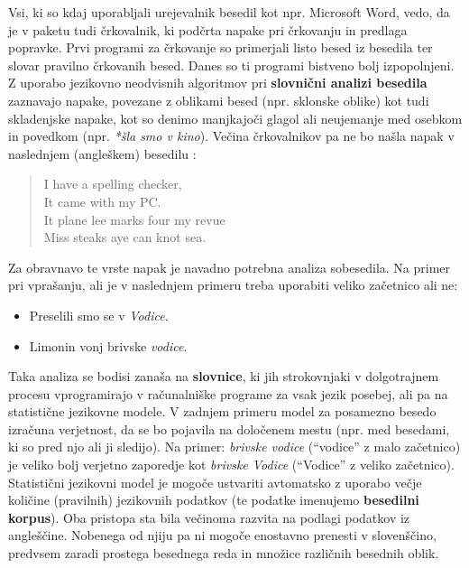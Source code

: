 \begin{multicols}{2}
Vsi, ki so kdaj uporab\-ljali urejevalnik besedil kot npr. Microsoft Word, vedo, da je v paketu tudi črkovalnik, ki podčrta napake pri črkovanju in predlaga popravke. Prvi programi za črkovanje so primerjali listo besed iz besedila ter slovar pravilno črkovanih besed. Danes so ti programi bistveno bolj izpopolnjeni. Z uporabo jezikovno neodvisnih algoritmov pri \textbf{slovnični analizi besedila} zaznavajo napake, povezane z oblikami besed (npr. sklonske oblike) kot tudi skladenjske napake, kot so denimo manjkajoči glagol ali  neujemanje med osebkom in povedkom (npr. \textit{*šla smo v kino}). Večina črkovalnikov pa ne bo našla napak v naslednjem (angleškem) besedilu \cite{zar1}:

\begin{quote}
  I have a spelling checker,\\
  It came with my PC.\\
  It plane lee marks four my revue\\
  Miss steaks aye can knot sea.
\end{quote}

Za obravnavo te vrste napak je navadno potrebna analiza sobesedila. Na primer pri vprašanju, ali je v naslednjem primeru treba uporabiti veliko začetnico ali ne:

\begin{itemize}
\item Preselili smo se v \textit{Vodice}.
\item Limonin vonj brivske \textit{vodice}.
\end{itemize}

Taka analiza se bodisi zanaša na \textbf{slovnice}, ki jih strokovnjaki v dolgotrajnem procesu vprogramirajo v računalniške programe za vsak jezik posebej, ali pa na statistične jezikovne modele. V zadnjem primeru model za posamezno besedo izračuna verjetnost, da se bo pojavila na določenem mestu (npr. med besedami, ki so pred njo ali ji sledijo). Na primer: \textit{brivske vodice} (“vodice” z malo začetnico) je veliko bolj verjetno zaporedje kot \textit{brivske Vodice} (“Vodice” z veliko začetnico). Statistični jezikovni model je mogoče ustvariti avtomatsko z uporabo večje količine (pravilnih) jezikovnih podatkov (te podatke imenujemo \textbf{besedilni korpus}). Oba pristopa sta bila  večinoma razvita na podlagi podatkov iz angleščine. Nobenega od njiju pa ni mogoče enostavno prenesti v slovenščino, predvsem zaradi prostega besednega reda in množice različnih besednih oblik.


\end{multicols}
